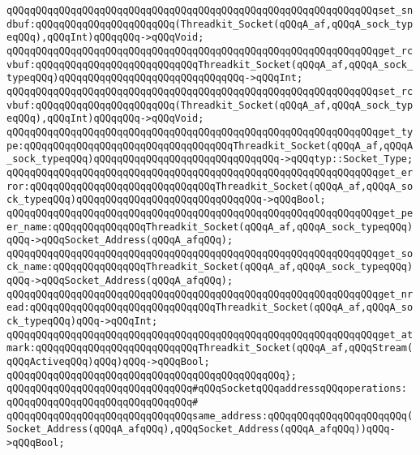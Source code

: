 \verb|qQQqqQQqqQQqqQQqqQQqqQQqqQQqqQQqqQQqqQQqqQQqqQQqqQQqqQQqqQQqqQQqset_sndbuf:qQQqqQQqqQQqqQQqqQQqqQQq(Threadkit_Socket(qQQqA_af,qQQqA_sock_typeqQQq),qQQqInt)qQQqqQQq->qQQqVoid;|\newline
\verb|qQQqqQQqqQQqqQQqqQQqqQQqqQQqqQQqqQQqqQQqqQQqqQQqqQQqqQQqqQQqqQQqget_rcvbuf:qQQqqQQqqQQqqQQqqQQqqQQqqQQqThreadkit_Socket(qQQqA_af,qQQqA_sock_typeqQQq)qQQqqQQqqQQqqQQqqQQqqQQqqQQqqQQq->qQQqInt;|\newline
\verb|qQQqqQQqqQQqqQQqqQQqqQQqqQQqqQQqqQQqqQQqqQQqqQQqqQQqqQQqqQQqqQQqset_rcvbuf:qQQqqQQqqQQqqQQqqQQqqQQq(Threadkit_Socket(qQQqA_af,qQQqA_sock_typeqQQq),qQQqInt)qQQqqQQq->qQQqVoid;|\newline
\verb|qQQqqQQqqQQqqQQqqQQqqQQqqQQqqQQqqQQqqQQqqQQqqQQqqQQqqQQqqQQqqQQqget_type:qQQqqQQqqQQqqQQqqQQqqQQqqQQqqQQqqQQqThreadkit_Socket(qQQqA_af,qQQqA_sock_typeqQQq)qQQqqQQqqQQqqQQqqQQqqQQqqQQqqQQq->qQQqtyp::Socket_Type;|\newline
\verb|qQQqqQQqqQQqqQQqqQQqqQQqqQQqqQQqqQQqqQQqqQQqqQQqqQQqqQQqqQQqqQQqget_error:qQQqqQQqqQQqqQQqqQQqqQQqqQQqqQQqThreadkit_Socket(qQQqA_af,qQQqA_sock_typeqQQq)qQQqqQQqqQQqqQQqqQQqqQQqqQQqqQQq->qQQqBool;|\newline
\newline
\verb|qQQqqQQqqQQqqQQqqQQqqQQqqQQqqQQqqQQqqQQqqQQqqQQqqQQqqQQqqQQqqQQqget_peer_name:qQQqqQQqqQQqqQQqThreadkit_Socket(qQQqA_af,qQQqA_sock_typeqQQq)qQQq->qQQqSocket_Address(qQQqA_afqQQq);|\newline
\verb|qQQqqQQqqQQqqQQqqQQqqQQqqQQqqQQqqQQqqQQqqQQqqQQqqQQqqQQqqQQqqQQqget_sock_name:qQQqqQQqqQQqqQQqThreadkit_Socket(qQQqA_af,qQQqA_sock_typeqQQq)qQQq->qQQqSocket_Address(qQQqA_afqQQq);|\newline
\verb|qQQqqQQqqQQqqQQqqQQqqQQqqQQqqQQqqQQqqQQqqQQqqQQqqQQqqQQqqQQqqQQqget_nread:qQQqqQQqqQQqqQQqqQQqqQQqqQQqqQQqThreadkit_Socket(qQQqA_af,qQQqA_sock_typeqQQq)qQQq->qQQqInt;|\newline
\verb|qQQqqQQqqQQqqQQqqQQqqQQqqQQqqQQqqQQqqQQqqQQqqQQqqQQqqQQqqQQqqQQqget_atmark:qQQqqQQqqQQqqQQqqQQqqQQqqQQqThreadkit_Socket(qQQqA_af,qQQqStream(qQQqActiveqQQq)qQQq)qQQq->qQQqBool;|\newline
\verb|qQQqqQQqqQQqqQQqqQQqqQQqqQQqqQQqqQQqqQQqqQQqqQQq};|\newline
\newline
\verb|qQQqqQQqqQQqqQQqqQQqqQQqqQQqqQQq#qQQqSocketqQQqaddressqQQqoperations:|\newline
\verb|qQQqqQQqqQQqqQQqqQQqqQQqqQQqqQQq#|\newline
\verb|qQQqqQQqqQQqqQQqqQQqqQQqqQQqqQQqsame_address:qQQqqQQqqQQqqQQqqQQqqQQq(Socket_Address(qQQqA_afqQQq),qQQqSocket_Address(qQQqA_afqQQq))qQQq->qQQqBool;|\newline
